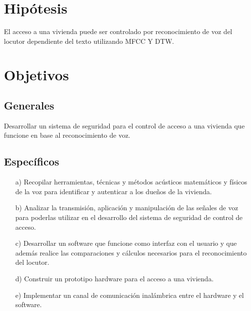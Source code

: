 \section{Hipótesis}
El acceso a una vivienda puede ser controlado por reconocimiento de voz del locutor dependiente del texto utilizando MFCC Y DTW.

\section{Objetivos}
\subsection{Generales}
Desarrollar un sistema de seguridad para el control de acceso a una vivienda que funcione en base al reconocimiento de voz.
\subsection{Específicos}
\begin{enumerate}
\item[a)]Recopilar herramientas, técnicas y métodos acústicos matemáticos y físicos de la voz para identificar y autenticar a los dueños de la vivienda.
\item[b)]Analizar la transmisión, aplicación y manipulación de las señales de voz para poderlas utilizar en el desarrollo del sistema de seguridad de control de acceso.
\item[c)]Desarrollar un software que funcione como interfaz con el usuario y que además realice las comparaciones y cálculos necesarios para el reconocimiento del locutor.
\item[d)]Construir un prototipo hardware para el acceso a una vivienda.
\item[e)]Implementar un canal de comunicación inalámbrica entre el hardware y el software.
\end{enumerate}


